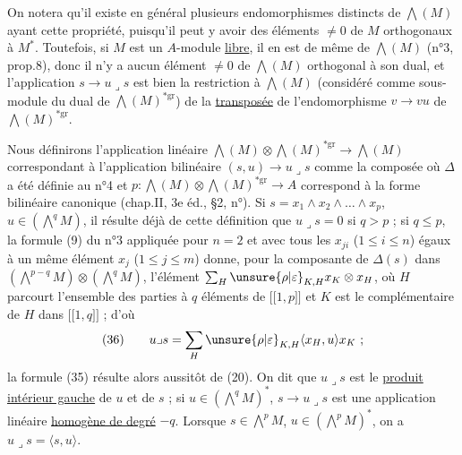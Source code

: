 On notera qu'il existe en général plusieurs endomorphismes distincts de $\bigwedge(M)$ ayant cette propriété, puisqu'il peut y avoir des éléments $\ne0$ de $M$ orthogonaux à $M^*$. Toutefois, si $M$ est un $A$-module \uline{libre}, il en est de même de $\bigwedge(M)$ (n°3, prop.8), donc il n'y a aucun élément $\ne0$ de $\bigwedge(M)$ orthogonal à son dual, et l'application $s\longrightarrow u\lrcorner s$ est bien la restriction à $\bigwedge(M)$ (considéré comme sous-module du dual de $\bigwedge(M)^{*\mathrm{gr}}$) de la \uline{transposée} de l'endomorphisme $v\longrightarrow vu$ de $\bigwedge(M)^{*\mathrm{gr}}$.

Nous définirons l'application linéaire $\bigwedge(M)\otimes\bigwedge(M)^{*\mathrm{gr}}\longrightarrow\bigwedge(M)$ correspondant à l'application bilinéaire $(s,u)\longrightarrow u\lrcorner s$ comme la composée
où $\Delta$ a été définie au n°4 et $p:\bigwedge(M)\otimes\bigwedge(M)^{*\mathrm{gr}}\longrightarrow A$ correspond à la forme bilinéaire canonique (chap.II, 3e éd., §2, n°\quad). Si $s=x_1\wedge x_2\wedge\ldots\wedge x_p$, $u\in(\bigwedge^qM)$, il résulte déjà de cette définition que $u\lrcorner s=0$ si $q>p$ ; si $q\leq p$, la formule (9) du n°3 appliquée pour $n=2$ et avec tous les $x_{ji}$ ($1\leq i\leq n$) égaux à un même élément $x_j$ ($1\leq j\leq m$) donne, pour la composante de $\Delta(s)$ dans $(\bigwedge^{p-q}M)\otimes(\bigwedge^qM)$, l'élément $\sum_H\unsure{\rho|\varepsilon}_{K,H}x_K\otimes x_H$, où $H$ parcourt l'ensemble des parties à $q$ éléments de $\lbrack\!\lbrack1,p\rbrack\!\rbrack$ et $K$ est le complémentaire de $H$ dans $\lbrack\!\lbrack1,q\rbrack\!\rbrack$ ; d'où
\[
(36)\qquad u\lrcorner s=\sum_H\unsure{\rho|\varepsilon}_{K,H}\langle x_H,u\rangle x_K\ ;
\]
la formule (35) résulte alors aussitôt de (20). On dit que $u\lrcorner s$ est le \uline{produit intérieur gauche} de $u$ et de $s$ ; si $u\in(\bigwedge^qM)^*$, $s\longrightarrow u\lrcorner s$ est une application linéaire \uline{homogène de degré} $-q$. Lorsque $s\in\bigwedge^pM$, $u\in(\bigwedge^pM)^*$, on a $u\lrcorner s=\langle s,u\rangle$.

